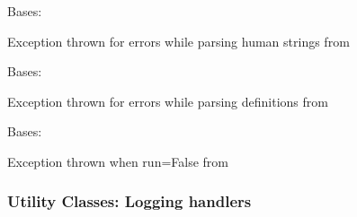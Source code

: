 \documentclass[letterpaper,10pt,english]{sphinxmanual}
\begin{document}

\begin{fulllineitems}
\label{pytan.utils:pytan.utils.HumanParserError}
Bases: \href{http://docs.python.org/2.7/library/exceptions.html\#exceptions.Exception}{}

Exception thrown for errors while parsing human strings from {\hyperref[pytan.handler:module-pytan.handler]{}}

\end{fulllineitems}


\begin{fulllineitems}
\label{pytan.utils:pytan.utils.DefinitionParserError}
Bases: \href{http://docs.python.org/2.7/library/exceptions.html\#exceptions.Exception}{}

Exception thrown for errors while parsing definitions from {\hyperref[pytan.handler:module-pytan.handler]{}}

\end{fulllineitems}


\begin{fulllineitems}
\label{pytan.utils:pytan.utils.RunFalse}
Bases: \href{http://docs.python.org/2.7/library/exceptions.html\#exceptions.Exception}{}

Exception thrown when run=False from {\hyperref[pytan.handler:pytan.handler.Handler.deploy_action]{}}

\end{fulllineitems}



\subsubsection{Utility Classes: Logging handlers}
\label{pytan.utils:utility-classes-logging-handlers}
\end{document}
